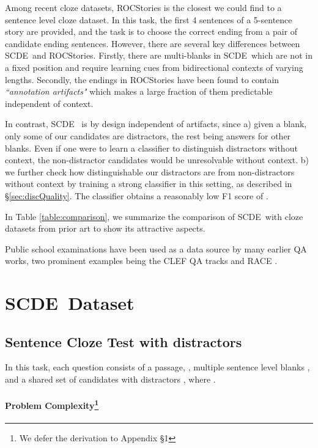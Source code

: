 \documentclass[11pt,a4paper]{article}
\newcommand{\dsname}{\textsc{SCDE}}
\begin{document}
Among recent cloze datasets, ROCStories \cite{mostafazadeh2017lsdsem} is the closest we could find to a sentence level cloze dataset. In this task, the first 4 sentences of a 5-sentence story are provided, and the task is to choose the correct ending from a pair of candidate ending sentences. However, there are several key differences between \dsname~and ROCStories. Firstly, there are multi-blanks in \dsname~which are not in a fixed position and require learning cues from bidirectional contexts of varying lengths. Secondly, the endings in ROCStories have been found to contain \emph{``annotation artifacts"} \cite{gururangan2018annotation} which makes a large fraction of them predictable independent of context. 

In contrast, \dsname~ is by design independent of artifacts, since
 a) given a blank, only some of our candidates are distractors, the rest being answers for other blanks. Even if one were to learn a classifier to distinguish distractors without context, the non-distractor candidates would be unresolvable without context. b) we further check how distinguishable our distractors are from non-distractors without context  by training a  strong classifier in this setting, as described in \S \ref{sec:discQuality}. The classifier obtains a reasonably low F1 score of .

In Table \ref{table:comparison}, we summarize the comparison of \dsname~with cloze datasets from prior art to show its attractive aspects.

Public school examinations have been used as a data source by many earlier QA works, two prominent examples being the CLEF QA tracks \cite{penas2014overview,rodrigo2015overview} and RACE \cite{lai2017race}. 



\section{\dsname~Dataset}
\label{sec:senta}
\subsection{Sentence Cloze Test with distractors}
In this task, each question consists of a passage, , multiple sentence level  blanks ,  and  a  shared  set  of  candidates  with distractors , where .
\paragraph{Problem Complexity\footnote{We defer the derivation to Appendix \S 1}} 
\end{document}

